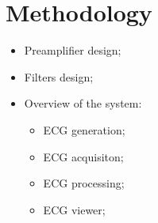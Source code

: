\section{Methodology}

\begin{itemize}
    \item Preamplifier design;
    \item Filters design;
    \item Overview of the system:
    \begin{itemize}
        \item ECG generation;
        \item ECG acquisiton;
        \item ECG processing;
        \item ECG viewer;
    \end{itemize}
\end{itemize}

\pagebreak